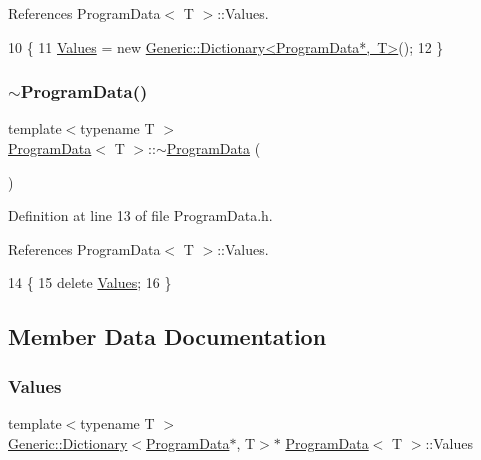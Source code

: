References Program\+Data$<$ T $>$\+::\+Values.


\begin{DoxyCode}
10     \{
11         \mbox{\hyperlink{classProgramData_a1dea8570e013c06776692b248f25a534}{Values}} = \textcolor{keyword}{new} \mbox{\hyperlink{classGeneric_1_1Dictionary}{Generic::Dictionary<ProgramData*, T>}}();
12     \}
\end{DoxyCode}
\mbox{\label{classProgramData_a04be8ca855f8898c4ca8297518c70f23}} 
\subsubsection{\texorpdfstring{$\sim$\+Program\+Data()}{~ProgramData()}}
{\footnotesize\ttfamily template$<$typename T $>$ \\
\mbox{\hyperlink{classProgramData}{Program\+Data}}$<$ T $>$\+::$\sim$\mbox{\hyperlink{classProgramData}{Program\+Data}} (\begin{DoxyParamCaption}{ }\end{DoxyParamCaption})\hspace{0.3cm}{\ttfamily [inline]}}



Definition at line 13 of file Program\+Data.\+h.



References Program\+Data$<$ T $>$\+::\+Values.


\begin{DoxyCode}
14     \{
15         \textcolor{keyword}{delete} \mbox{\hyperlink{classProgramData_a1dea8570e013c06776692b248f25a534}{Values}};
16     \}
\end{DoxyCode}


\subsection{Member Data Documentation}
\mbox{\label{classProgramData_a1dea8570e013c06776692b248f25a534}} 
\subsubsection{\texorpdfstring{Values}{Values}}
{\footnotesize\ttfamily template$<$typename T $>$ \\
\mbox{\hyperlink{classGeneric_1_1Dictionary}{Generic\+::\+Dictionary}}$<$\mbox{\hyperlink{classProgramData}{Program\+Data}}$\ast$, T$>$$\ast$ \mbox{\hyperlink{classProgramData}{Program\+Data}}$<$ T $>$\+::Values}



